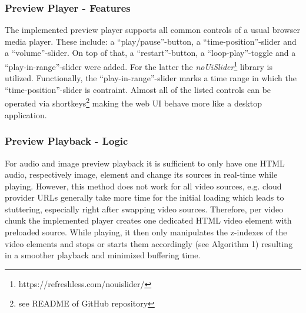 \documentclass[conference]{IEEEtran}
\begin{document}
\subsubsection{Preview Player - Features}
The implemented preview player supports all common controls of a usual browser media player.
These include: a ``play/pause''-button, a ``time-position''-slider and a ``volume''-slider.
On top of that, a ``restart''-button, a ``loop-play''-toggle and a ``play-in-range''-slider were added.
For the latter the \textit{noUiSlider}\footnote{https://refreshless.com/nouislider/} library is utilized.
Functionally, the ``play-in-range''-slider marks a time range in which the ``time-position''-slider is contraint.
Almost all of the listed controls can be operated via shortkeys\footnote{see README of GitHub repository} making the web UI behave more like a desktop application.
\\
\subsubsection{Preview Playback - Logic}
For audio and image preview playback it is sufficient to only have one HTML audio, respectively image, element and change its sources in real-time while playing.
However, this method does not work for all video sources, e.g. cloud provider URLs generally take more time for the initial loading which leads to stuttering, especially right after swapping video sources.
Therefore, per video chunk the implemented player creates one dedicated HTML video element with preloaded source.
While playing, it then only manipulates the z-indexes of the video elements and stops or starts them accordingly (see Algorithm 1) resulting in a smoother playback and minimized buffering time.
\end{document}
